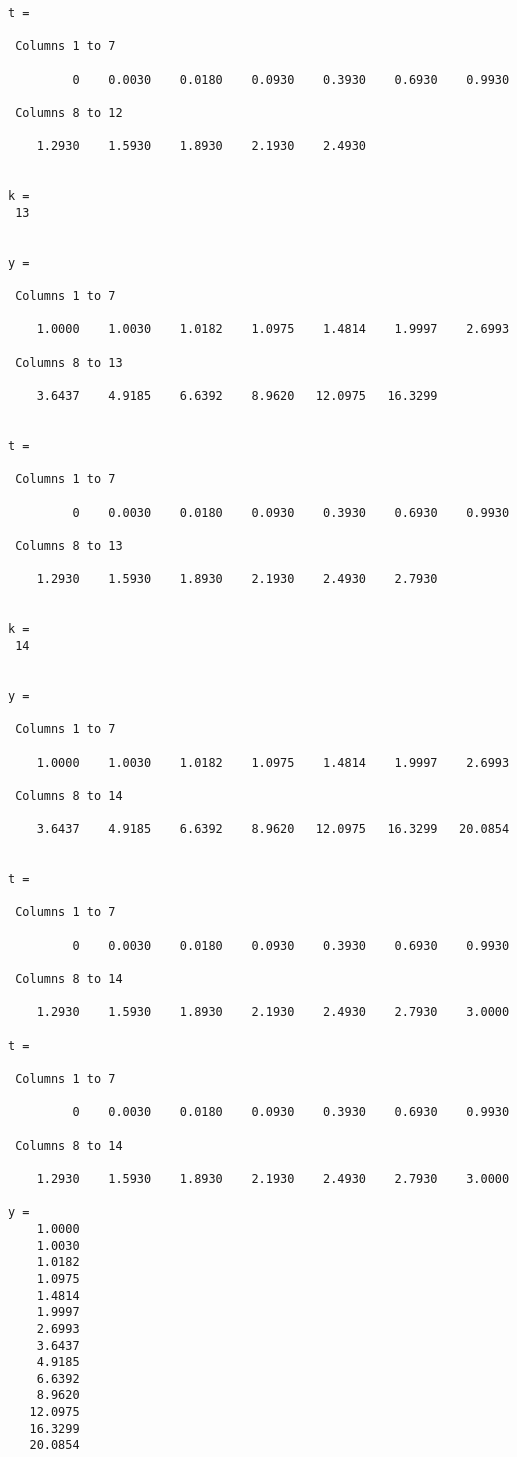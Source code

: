 \begin{verbatim}
t = 

 Columns 1 to 7

         0    0.0030    0.0180    0.0930    0.3930    0.6930    0.9930 

 Columns 8 to 12

    1.2930    1.5930    1.8930    2.1930    2.4930 


k = 
 13 


y = 

 Columns 1 to 7

    1.0000    1.0030    1.0182    1.0975    1.4814    1.9997    2.6993 

 Columns 8 to 13

    3.6437    4.9185    6.6392    8.9620   12.0975   16.3299 


t = 

 Columns 1 to 7

         0    0.0030    0.0180    0.0930    0.3930    0.6930    0.9930 

 Columns 8 to 13

    1.2930    1.5930    1.8930    2.1930    2.4930    2.7930 


k = 
 14 


y = 

 Columns 1 to 7

    1.0000    1.0030    1.0182    1.0975    1.4814    1.9997    2.6993 

 Columns 8 to 14

    3.6437    4.9185    6.6392    8.9620   12.0975   16.3299   20.0854 


t = 

 Columns 1 to 7

         0    0.0030    0.0180    0.0930    0.3930    0.6930    0.9930 

 Columns 8 to 14

    1.2930    1.5930    1.8930    2.1930    2.4930    2.7930    3.0000 

t = 

 Columns 1 to 7

         0    0.0030    0.0180    0.0930    0.3930    0.6930    0.9930 

 Columns 8 to 14

    1.2930    1.5930    1.8930    2.1930    2.4930    2.7930    3.0000 

y = 
    1.0000 
    1.0030 
    1.0182 
    1.0975 
    1.4814 
    1.9997 
    2.6993 
    3.6437 
    4.9185 
    6.6392 
    8.9620 
   12.0975 
   16.3299 
   20.0854 
\end{verbatim}
